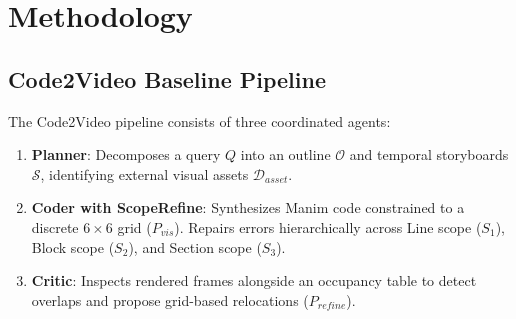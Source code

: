 \documentclass{article}
\begin{document}
\section{Methodology}
\label{sec:method}

\subsection{Code2Video Baseline Pipeline}
The Code2Video pipeline consists of three coordinated agents:
\begin{enumerate}
    \item \textbf{Planner}: Decomposes a query $Q$ into an outline $\mathcal{O}$ and temporal storyboards $\mathcal{S}$, identifying external visual assets $\mathcal{D}_{asset}$.
    \item \textbf{Coder with ScopeRefine}: Synthesizes Manim code constrained to a discrete $6\times 6$ grid ($P_{vis}$). Repairs errors hierarchically across Line scope ($S_1$), Block scope ($S_2$), and Section scope ($S_3$).
    \item \textbf{Critic}: Inspects rendered frames alongside an occupancy table to detect overlaps and propose grid-based relocations ($P_{refine}$).
\end{enumerate}
\end{document}
